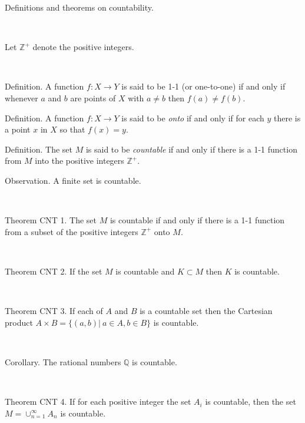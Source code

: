\documentclass[12pt, std]{article}
\begin{document}
Definitions and theorems on countability.

\

Let $\mathbb{Z}^+$ denote the positive integers.

\

Definition.  A function $f: X \rightarrow Y$ is said to be 1-1 (or one-to-one) if and only if whenever $a$ and $b$ are points of $X$ with $a \ne b$ then $f(a) \ne f(b)$.

Definition.  A function $f: X\rightarrow Y$ is said to be \textit{onto} if and only if for each $y$ there is a point $x$ in $X$ so that $f(x) = y$.

Definition.  The set $M$ is said to be \textit{countable} if and only if there is a 1-1 function from $M$ into the positive integers $\mathbb{Z}^+$.


Observation.  A finite set is countable.

\

Theorem CNT 1. The set $M$ is countable if and only if there is a 1-1 function from a subset of the positive integers $\mathbb{Z}^+$ onto $M$.

\


Theorem CNT 2. If the set $M$ is countable and $K \subset M$ then $K$ is countable.

\

Theorem CNT 3. If each of $A$ and $B$ is a countable set then the Cartesian product $A \times B = \{ (a,b) | \ a \in A, b \in B \}$ is countable.

\

Corollary.  The rational numbers $\mathbb{Q}$ is countable.

\

Theorem CNT 4.  If for each positive integer the set $A_i$ is countable, then the set $M = \cup_{n=1}^{\infty} A_n$ is countable.

\
\end{document}
